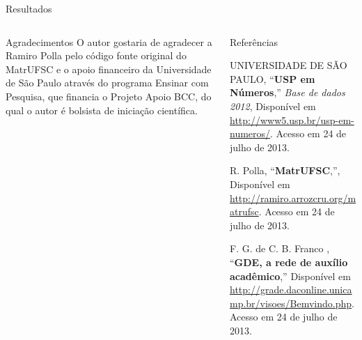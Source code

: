 \documentclass[final]{beamer}
\begin{document}
\begin{frame}[t]
\begin{columns}[t]
\begin{column}{0.61\paperwidth}
\begin{block}{Resultados}
\end{block}

\end{column}
\end{columns}

\begin{columns}[t] 
	\begin{column}{0.35\columnwidth}

		\begin{block}{Agradecimentos}
			O autor gostaria de agradecer a Ramiro Polla pelo código fonte original
			do MatrUFSC e o apoio financeiro da Universidade de São
			Paulo através do programa Ensinar com Pesquisa, que financia o Projeto
			Apoio BCC, do qual o autor é bolsista de iniciação científica.
		\end{block}

	\end{column}

	\begin{column}{0.61\columnwidth}
		\begin{block}{Referências}
			\footnotesize{\begin{thebibliography}{99}
			UNIVERSIDADE DE SÃO PAULO, ``\textbf{USP em Números},'' \emph{Base de dados 2012},
			Disponível em \url{http://www5.usp.br/usp-em-numeros/}. Acesso em 24 de julho de 2013.

			R. Polla, ``\textbf{MatrUFSC},'',
			Disponível em \url{http://ramiro.arrozcru.org/matrufsc}. Acesso em 24 de julho de 2013.

			F. G. de C. B. Franco , ``\textbf{GDE, a rede de auxílio acadêmico},''
			Disponível em \url{http://grade.daconline.unicamp.br/visoes/Bemvindo.php}. Acesso em 24 de julho de 2013.
			\end{thebibliography}}

		\end{block}
	
	\end{column}
\end{columns}


\end{frame}
\end{document}
